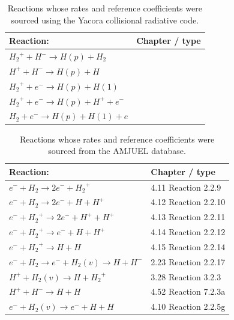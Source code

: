 \begin{table}[h]%
\begin{tabular}{ | p{7cm}| m{3.5cm} | } 
\hline
Reaction: & Chapter / type \\ 
\hline
${H_2}^+ + H^- \rightarrow H(p) + H_2$ &  \\
\hline
$H^+ + H^- \rightarrow H(p) + H$ & \\
\hline
${H_2}^+ + e^- \rightarrow H(p) + H(1)$ & \\
\hline
${H_2}^+ + e^- \rightarrow H(p) + H^+ + e^-$ & \\
\hline
$H_2 + e^- \rightarrow H(p) + H(1) + e$ & \\
\hline
\end{tabular}
\caption{Reactions whose rates and reference coefficients were sourced using the Yacora collisional radiative code.\cite{Wunderlich2016,Wunderlich2020}}
\label{tab:yacora}
\end{table}

\begin{table}[h]
\begin{tabular}{ | p{7cm}| m{3.5cm} | } 
\hline
Reaction: & Chapter / type \\ 
\hline
$e^- + H_2 \rightarrow 2e^- + {H_2}^+$ & 4.11 Reaction 2.2.9 \\
\hline
$e^- + H_2 \rightarrow 2e^- + H + H^+$ & 4.12 Reaction 2.2.10 \\
\hline
$e^- + {H_2}^+ \rightarrow 2e^- + H^+ + H^+$ & 4.13 Reaction 2.2.11 \\
\hline
$e^- + {H_2}^+ \rightarrow e^- + H + H^+$ & 4.14 Reaction 2.2.12 \\
\hline
$e^- + {H_2}^+ \rightarrow H + H$ & 4.15 Reaction 2.2.14 \\
\hline
$e^- + H_2 \rightarrow e^- + H_2(v) \rightarrow H + H^-$ & 2.23 Reaction 2.2.17 \\
\hline
$H^+ + H_2(v) \rightarrow H + {H_2}^+$ & 3.28 Reaction 3.2.3 \\
\hline
$H^+ + H^- \rightarrow H + H$ & 4.52 Reaction 7.2.3a \\    %
\hline
$e^- + H_2(v) \rightarrow e^- + H + H$ & 4.10 Reaction 2.2.5g \\    %
\hline
\end{tabular}
\caption{Reactions whose rates and reference coefficients were sourced from the AMJUEL database.\cite{Reiter2017,Reiter2005,Kotov2007}}
\label{tab:amjuel}
\end{table}

